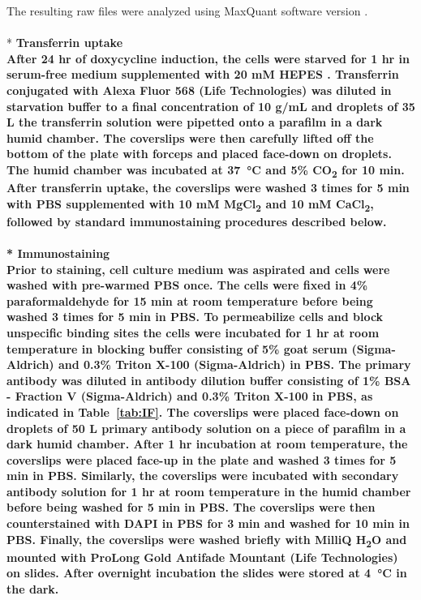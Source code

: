 The resulting raw files were analyzed using MaxQuant software version
.
\\
\\*
\bfseries{Transferrin uptake}\\
\normalfont After 24 hr of doxycycline induction, the cells were starved for 1 hr in serum-free medium supplemented with 20 mM HEPES
. Transferrin conjugated with Alexa Fluor 568 (Life Technologies) was diluted in starvation buffer to a final concentration of 10 {}\textmu g/mL and droplets of 35 {}\textmu L the transferrin solution were pipetted onto a parafilm in a dark humid chamber. The coverslips were then carefully lifted off the bottom of the plate with forceps and placed face-down on droplets. The humid chamber was incubated at \SI{37}{\celsius} and 5\% CO\textsubscript{2} for 10 min. After transferrin uptake, the coverslips were washed 3 times for 5 min with PBS supplemented with 10 mM MgCl\textsubscript{2} and 10 mM CaCl\textsubscript{2}, followed by standard immunostaining procedures described below.
\\
\\*
\bfseries{Immunostaining}\\
\normalfont Prior to staining, cell culture medium was aspirated and cells were washed with pre-warmed PBS once. The cells were fixed in 4\% paraformaldehyde for 15 min at room temperature before being washed 3 times for 5 min in PBS. To permeabilize cells and block unspecific binding sites the cells were incubated for 1 hr at room temperature in blocking buffer consisting of 5\% goat serum (Sigma-Aldrich) and 0.3\% Triton X-100 (Sigma-Aldrich) in PBS. The primary antibody was diluted in antibody dilution buffer consisting of 1\% BSA - Fraction V (Sigma-Aldrich) and 0.3\% Triton X-100 in PBS, as indicated in Table~\ref{tab:IF}. The coverslips were placed face-down on droplets of 50 {}\textmu L primary antibody solution on a piece of parafilm in a dark humid chamber. After 1 hr incubation at room temperature, the coverslips were placed face-up in the plate and washed 3 times for 5 min in PBS. Similarly, the coverslips were incubated with secondary antibody solution for 1 hr at room temperature in the humid chamber before being washed for 5 min in PBS. The coverslips were then counterstained with 
DAPI in PBS for 3 min and washed for 10 min in PBS. Finally, the coverslips were washed briefly with MilliQ H\textsubscript{2}O and mounted with ProLong Gold Antifade Mountant (Life Technologies) on slides. After overnight incubation the slides were stored at \SI{4}{\celsius} in the dark.

